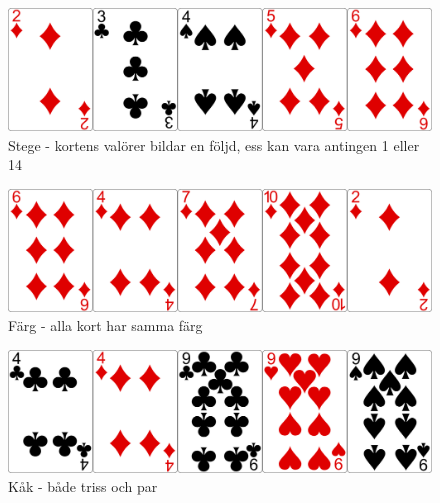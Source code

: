 \begin{figure}[h]
 \begin{minipage}[c]{0.5\textwidth}
  \includegraphics[width=\textwidth]{../img/w05-hands/straight.png}
 \end{minipage}
 \begin{minipage}[c]{0.3\textwidth}
  \caption{Stege - kortens valörer bildar en följd, ess kan vara antingen 1 eller 14}
 \end{minipage}
\end{figure}

\begin{figure}[h]
 \begin{minipage}[c]{0.5\textwidth}
  \includegraphics[width=\textwidth]{../img/w05-hands/flush.png}
 \end{minipage}
 \begin{minipage}[c]{0.3\textwidth}
  \caption{Färg - alla kort har samma färg}
 \end{minipage}
\end{figure}

\begin{figure}[h]
 \begin{minipage}[c]{0.5\textwidth}
  \includegraphics[width=\textwidth]{../img/w05-hands/fullhouse.png}
 \end{minipage}
 \begin{minipage}[c]{0.3\textwidth}
  \caption{Kåk - både triss och par}
 \end{minipage}
\end{figure}

